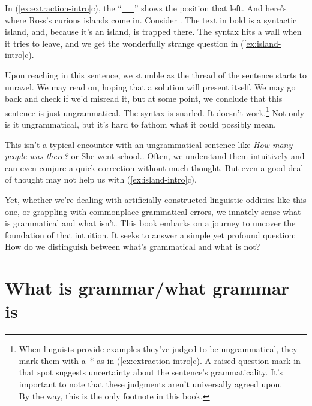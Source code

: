 In (\ref{ex:extraction-intro}c), the ``\underline{~~~}'' shows the position that  left. And here's where Ross's curious islands come in. Consider . The text in bold is a syntactic island, and, because it's an island,  is trapped there. The syntax hits a wall when it tries to leave, and we get the wonderfully strange question in (\ref{ex:island-intro}c).

\ea
\label{ex:island-intro}
\z\z

Upon reaching  in this sentence, we stumble as the thread of the sentence starts to unravel. We may read on, hoping that a solution will present itself. We may go back and check if we'd misread it, but at some point, we conclude that this sentence is just ungrammatical. The syntax is snarled. It doesn't work.\footnote{When linguists provide examples they've judged to be ungrammatical, they mark them with a~* as in (\ref{ex:extraction-intro}c). A raised question mark in that spot suggests uncertainty about the sentence's grammaticality. It's important to note that these judgments aren't universally agreed upon.\\By the way, this is the only footnote in this book.} Not only is it ungrammatical, but it's hard to fathom what it could possibly mean.

This isn't a typical encounter with an ungrammatical sentence like \textit{How many people was there?} or {She went school.}. Often, we understand them intuitively and can even conjure a quick correction without much thought. But even a good deal of thought may not help us with (\ref{ex:island-intro}c).

Yet, whether we're dealing with artificially constructed linguistic oddities like this one, or grappling with commonplace grammatical errors, we innately sense what is grammatical and what isn't. This book embarks on a journey to uncover the foundation of that intuition. It seeks to answer a simple yet profound question: How do we distinguish between what's grammatical and what is not?

\section{What is grammar/what grammar is}

